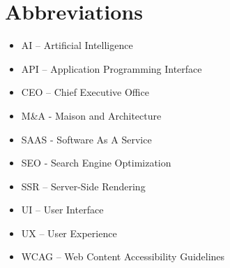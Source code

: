 \chapter*{Abbreviations}
\begin{itemize}
    \item AI – Artificial Intelligence
    \item API – Application Programming Interface
    \item CEO – Chief Executive Office
    \item M\&A - Maison and Architecture
    \item SAAS - Software As A Service
    \item SEO - Search Engine Optimization
    \item SSR – Server-Side Rendering
    \item UI – User Interface
    \item UX – User Experience
    \item WCAG – Web Content Accessibility Guidelines
\end{itemize}
